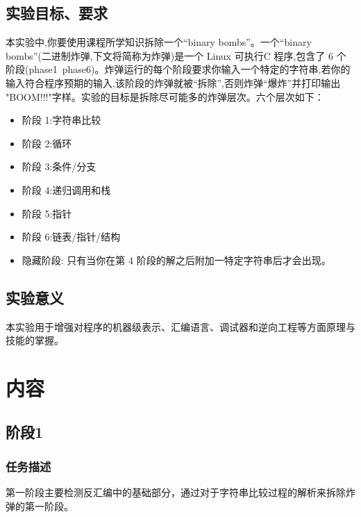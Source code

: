 \subsection{实验目标、要求}
本实验中,你要使用课程所学知识拆除一个“binary bombs”。一个“binary bombs”(二进制炸弹,下文将简称为炸弹)是一个 Linux 可执行C 程序,包含了 6 个阶段(phase1~phase6)。炸弹运行的每个阶段要求你输入一个特定的字符串,若你的输入符合程序预期的输入,该阶段的炸弹就被“拆除”,否则炸弹“爆炸”并打印输出 "BOOM!!!"字样。实验的目标是拆除尽可能多的炸弹层次。六个层次如下：
\begin{itemize}
	\item 阶段 1:字符串比较
	\item 阶段 2:循环
	\item 阶段 3:条件/分支
	\item 阶段 4:递归调用和栈
	\item 阶段 5:指针
	\item 阶段 6:链表/指针/结构
	\item 隐藏阶段: 只有当你在第 4 阶段的解之后附加一特定字符串后才会出现。
\end{itemize}

\subsection{实验意义}
本实验用于增强对程序的机器级表示、汇编语言、调试器和逆向工程等方面原理与技能的掌握。\par

\newpage
\section{内容}

\subsection{阶段1}
\subsubsection{任务描述}
第一阶段主要检测反汇编中的基础部分，通过对于字符串比较过程的解析来拆除炸弹的第一阶段。

